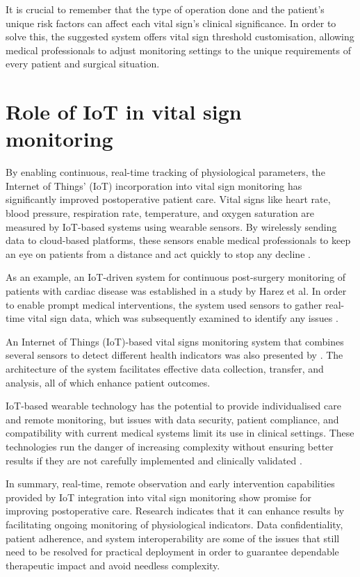 It is crucial to remember that the type of operation done and the patient's unique risk factors can affect each vital sign's clinical significance. In order to solve this, the suggested system offers vital sign threshold customisation, allowing medical professionals to adjust monitoring settings to the unique requirements of every patient and surgical situation.

\section{Role of IoT in vital sign monitoring} %
By enabling continuous, real-time tracking of physiological parameters, the Internet of Things' (IoT) incorporation into vital sign monitoring has significantly improved postoperative patient care. Vital signs like heart rate, blood pressure, respiration rate, temperature, and oxygen saturation are measured by IoT-based systems using wearable sensors. By wirelessly sending data to cloud-based platforms, these sensors enable medical professionals to keep an eye on patients from a distance and act quickly to stop any decline \cite{Olusegun_2025_RT_patient}.

As an example, an IoT-driven system for continuous post-surgery monitoring of patients with cardiac disease was established in a study by Harez et al. In order to enable prompt medical interventions, the system used sensors to gather real-time vital sign data, which was subsequently examined to identify any issues \cite{Harez_2024pxm}.

An Internet of Things (IoT)-based vital signs monitoring system that combines several sensors to detect different health indicators was also presented by \cite{Sundaravadivel_IoT_vital_signs}. The architecture of the system facilitates effective data collection, transfer, and analysis, all of which enhance patient outcomes.

IoT-based wearable technology has the potential to provide individualised care and remote monitoring, but issues with data security, patient compliance, and compatibility with current medical systems limit its use in clinical settings. These technologies run the danger of increasing complexity without ensuring better results if they are not carefully implemented and clinically validated \cite{Hamed_Wearable_Healthcare}.

In summary, real-time, remote observation and early intervention capabilities provided by IoT integration into vital sign monitoring show promise for improving postoperative care. Research indicates that it can enhance results by facilitating ongoing monitoring of physiological indicators. Data confidentiality, patient adherence, and system interoperability are some of the issues that still need to be resolved for practical deployment in order to guarantee dependable therapeutic impact and avoid needless complexity.

